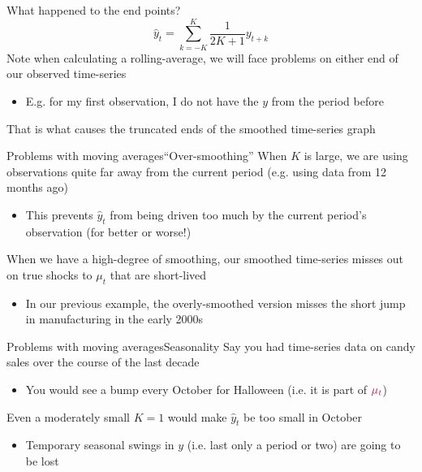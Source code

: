\documentclass[aspectratio=169,t,11pt,table]{beamer}
\begin{document}
\begin{frame}{What happened to the end points?}
  $$
    \hat{y}_t = \sum_{k=-K}^K \frac{1}{2K+1} y_{t + k}
  $$
  Note when calculating a rolling-average, we will face problems on either end of our observed time-series
  \begin{itemize}
    \item E.g. for my first observation, I do not have the $y$ from the period before
  \end{itemize}

  \pause
  \bigskip
  That is what causes the truncated ends of the smoothed time-series graph
\end{frame}


\begin{frame}{Problems with moving averages}{``Over-smoothing''}
  When $K$ is large, we are using observations quite far away from the current period (e.g. using data from 12 months ago)
  \begin{itemize}
    \item This prevents $\hat{y}_t$ from being driven too much by the current period's observation (for better or worse!)
  \end{itemize}

  \pause
  \bigskip
  When we have a high-degree of smoothing, our smoothed time-series misses out on true shocks to $\mu_t$ that are short-lived 
  \begin{itemize}
    \item In our previous example, the overly-smoothed version misses the short jump in manufacturing in the early 2000s
  \end{itemize}
\end{frame}

\begin{frame}{Problems with moving averages}{Seasonality}
  Say you had time-series data on candy sales over the course of the last decade
  \begin{itemize}
    \item You would see a bump every October for Halloween (i.e. it is part of ${\color[HTML]{B3114B} \mu_t}$)
  \end{itemize}

  \bigskip
  Even a moderately small $K = 1$ would make $\hat{y}_t$ be too small in October
  \begin{itemize}
    \item Temporary seasonal swings in $y$ (i.e. last only a period or two) are going to be lost
  \end{itemize}
\end{frame}
\end{document}
